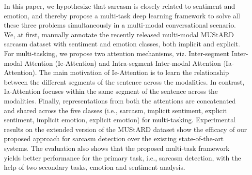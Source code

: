 In this paper, we hypothesize that sarcasm is closely related to sentiment and emotion, and thereby propose a multi-task deep learning framework to solve all these three problems simultaneously in a multi-modal conversational scenario. We, at first, manually annotate the recently released multi-modal MUStARD sarcasm dataset with sentiment and emotion classes, both implicit and explicit. For multi-tasking, we propose two attention mechanisms, viz. Inter-segment Inter-modal Attention (Ie-Attention) and Intra-segment Inter-modal Attention (Ia-Attention). The main motivation of Ie-Attention is to learn the relationship between the different segments of the sentence across the modalities. In contrast, Ia-Attention focuses within the same segment of the sentence across the modalities. Finally, representations from both the attentions are concatenated and shared across the five classes (i.e., sarcasm, implicit sentiment, explicit sentiment, implicit emotion, explicit emotion) for multi-tasking. Experimental results on the extended version of the MUStARD dataset show the efficacy of our proposed approach for sarcasm detection over the existing state-of-the-art systems. The evaluation also shows that the proposed multi-task framework yields better performance for the primary task, i.e., sarcasm detection, with the help of two secondary tasks, emotion and sentiment analysis.
